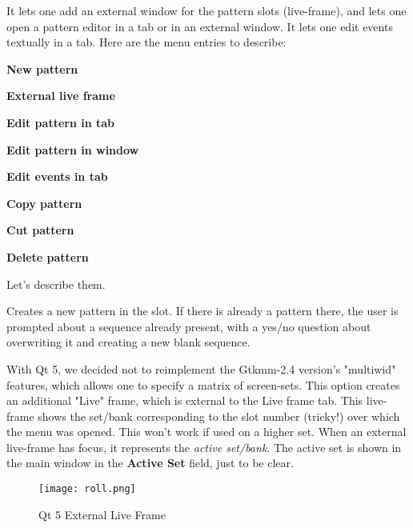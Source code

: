    It lets one add an external window for the pattern slots (live-frame),
   and lets one open a pattern editor in a tab or in an external window.
   It lets one edit events textually in a tab.  Here are the menu entries to
   describe:
   
   \begin{enumber}
      \item \textbf{New pattern}
      \item \textbf{External live frame}
      \item \textbf{Edit pattern in tab}
      \item \textbf{Edit pattern in window}
      \item \textbf{Edit events in tab}
      \item \textbf{Copy pattern}
      \item \textbf{Cut pattern}
      \item \textbf{Delete pattern}
   \end{enumber}

   Let's describe them.

   \setcounter{ItemCounter}{0}      %

      Creates a new pattern in the slot.
      If there is already a pattern there, the user is prompted about a
      sequence already present, with a yes/no question about overwriting it and
      creating a new blank sequence.

      With Qt 5, we decided not to reimplement the Gtkmm-2.4 version's
      "multiwid" features, which allows one to specify a matrix of screen-sets.
      This option creates an additional "Live" frame, which is external to the
      Live frame tab.  This live-frame shows the set/bank corresponding to the
      slot number (tricky!) over which the menu was opened.  This won't work if
      used on a higher set.  When an external live-frame has focus, it
      represents the \textsl{active set/bank}.  The active set is shown in the
      main window in the \textbf{Active Set} field, just to be clear.

\begin{figure}[H]
   \centering 
   \texttt{[image: roll.png]}
   \caption{Qt 5 External Live Frame}
   \label{fig:qt5_main_window_external_live_frame}
\end{figure}

